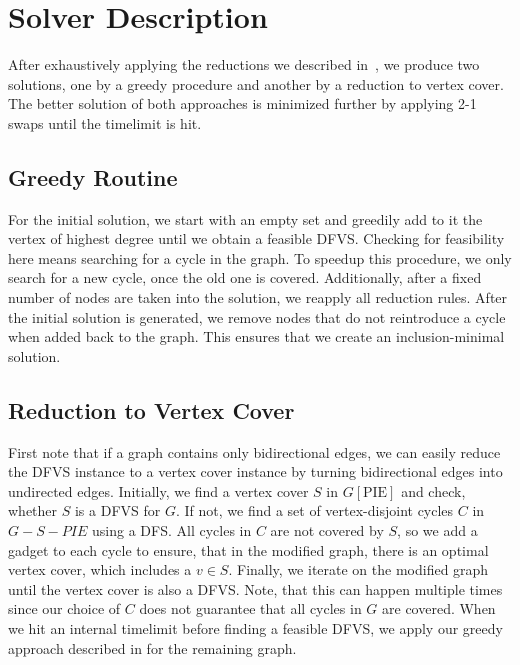 
\section{Solver Description}\label{sec:heuristic-solver}

After exhaustively applying the reductions we described in~, we produce two solutions, one by a greedy procedure and another by a reduction to vertex cover.
The better solution of both approaches is minimized further by applying 2-1 swaps until the timelimit is hit.

\subsection{Greedy Routine}\label{ssec:greedy-routine}

For the initial solution, we start with an empty set and greedily add to it the vertex of highest degree until we obtain a feasible DFVS. Checking for feasibility here means searching for a cycle in the graph. To speedup this procedure, we only search for a new cycle, once the old one is covered.
Additionally, after a fixed number of nodes are taken into the solution, we reapply all reduction rules.
After the initial solution is generated, we remove nodes that do not reintroduce a cycle when added back to the graph. This ensures that we create an inclusion-minimal solution.

\subsection{Reduction to Vertex Cover}\label{ssec:vertex_cover}

First note that if a graph contains only bidirectional edges, we can easily reduce the DFVS instance to a vertex cover instance by turning bidirectional edges into undirected edges.
Initially, we find a vertex cover $S$ in $G[\text{PIE}]$ and check, whether $S$ is a DFVS for $G$.
If not, we find a set of vertex-disjoint cycles $C$ in $G-S - PIE$ using a DFS.
All cycles in $C$ are not covered by $S$, so we add a gadget to each cycle to ensure, that in the modified graph, there is an optimal vertex cover, which includes a $v\in S$.
Finally, we iterate on the modified graph until the vertex cover is also a DFVS. Note, that this can happen multiple times since our choice of $C$ does not guarantee that all cycles in $G$ are covered.
When we hit an internal timelimit before finding a feasible DFVS, we apply our greedy approach described in  for the remaining graph.

